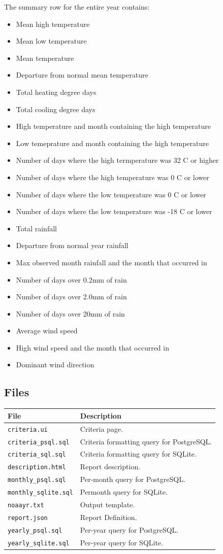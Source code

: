 \documentclass[a4paper,10pt]{book}
\begin{document}
The summary row for the entire year contains:
\begin{itemize}
\item Mean high temperature
\item Mean low temperature
\item Mean temperature
\item Departure from normal mean temperature
\item Total heating degree days
\item Total cooling degree days
\item High temperature and month containing the high temperature
\item Low temeprature and month containing the high temperature
\item Number of days where the high termperature was 32 \degree C or higher
\item Number of days where the high temperature was 0 \degree C or lower
\item Number of days where the low temperature was 0 \degree C or lower
\item Number of days where the low temperature was -18 \degree C or lower
\item Total rainfall
\item Departure from normal year rainfall
\item Max observed month rainfall and the month that occurred in
\item Number of days over 0.2mm of rain
\item Number of days over 2.0mm of rain
\item Number of days over 20mm of rain
\item Average wind speed
\item High wind speed and the month that occurred in
\item Dominant wind direction
\end{itemize}

\subsection{Files}
\begin{tabular}{p{4.5cm} l}
\hline
\textbf{File} & \textbf{Description} \\
\hline
\verb|criteria.ui| & Criteria page. \\
\verb|criteria_psql.sql| & Criteria formatting query for PostgreSQL. \\
\verb|criteria_sql.sql| & Criteria formatting query for SQLite. \\
\verb|description.html| & Report description. \\
\verb|monthly_psql.sql| & Per-month query for PostgreSQL. \\
\verb|monthly_sqlite.sql| & Permonth query for SQLite. \\
\verb|noaayr.txt| & Output template. \\
\verb|report.json| & Report Definition. \\
\verb|yearly_psql.sql| & Per-year query for PostgreSQL. \\
\verb|yearly_sqlite.sql| & Per-year query for SQLite. \\
\hline
\end{tabular}
\end{document}
